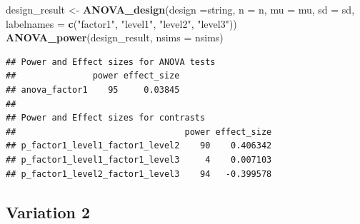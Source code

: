 \documentclass[]{book}
\newenvironment{Shaded}{\begin{snugshade}}{\end{snugshade}}
\newcommand{\DataTypeTok}[1]{\textcolor[rgb]{0.13,0.29,0.53}{#1}}
\newcommand{\KeywordTok}[1]{\textcolor[rgb]{0.13,0.29,0.53}{\textbf{#1}}}
\newcommand{\NormalTok}[1]{#1}
\newcommand{\StringTok}[1]{\textcolor[rgb]{0.31,0.60,0.02}{#1}}
\begin{document}
\begin{Shaded}
\begin{Highlighting}[]
\NormalTok{design_result <-}\StringTok{ }\KeywordTok{ANOVA_design}\NormalTok{(}\DataTypeTok{design =}\NormalTok{string,}
                   \DataTypeTok{n =}\NormalTok{ n, }
                   \DataTypeTok{mu =}\NormalTok{ mu, }
                   \DataTypeTok{sd =}\NormalTok{ sd, }
                   \DataTypeTok{labelnames =} \KeywordTok{c}\NormalTok{(}\StringTok{"factor1"}\NormalTok{, }\StringTok{"level1"}\NormalTok{, }\StringTok{"level2"}\NormalTok{, }\StringTok{"level3"}\NormalTok{))}
\KeywordTok{ANOVA_power}\NormalTok{(design_result, }\DataTypeTok{nsims =}\NormalTok{ nsims)}
\end{Highlighting}
\end{Shaded}

\begin{verbatim}
## Power and Effect sizes for ANOVA tests
##               power effect_size
## anova_factor1    95     0.03845
## 
## Power and Effect sizes for contrasts
##                                 power effect_size
## p_factor1_level1_factor1_level2    90    0.406342
## p_factor1_level1_factor1_level3     4    0.007103
## p_factor1_level2_factor1_level3    94   -0.399578
\end{verbatim}

\hypertarget{variation-2}{%
\subsection{Variation 2}\label{variation-2}}
\end{document}
